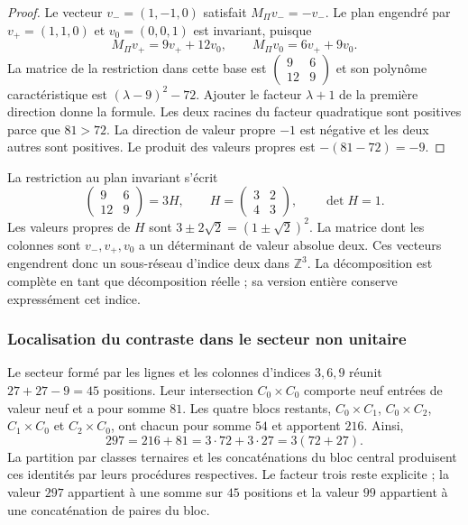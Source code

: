 \begin{proof}
Le vecteur $v_-=(1,-1,0)$ satisfait $M_\Pi v_-=-v_-$. Le plan engendré par $v_+=(1,1,0)$ et $v_0=(0,0,1)$ est invariant, puisque
\[
 M_\Pi v_+=9v_++12v_0,\qquad
 M_\Pi v_0=6v_++9v_0.
\]
La matrice de la restriction dans cette base est $\left(\begin{smallmatrix}9&6\\12&9\end{smallmatrix}\right)$ et son polynôme caractéristique est $(\lambda-9)^2-72$. Ajouter le facteur $\lambda+1$ de la première direction donne la formule. Les deux racines du facteur quadratique sont positives parce que $81>72$. La direction de valeur propre $-1$ est négative et les deux autres sont positives. Le produit des valeurs propres est $-(81-72)=-9$.
\end{proof}

La restriction au plan invariant s'écrit
\[
 \begin{pmatrix}9&6\\12&9\end{pmatrix}
 =3H,\qquad
 H=\begin{pmatrix}3&2\\4&3\end{pmatrix},\qquad\det H=1.
\]
Les valeurs propres de $H$ sont $3\pm2\sqrt2=(1\pm\sqrt2)^2$. La matrice dont les colonnes sont $v_-,v_+,v_0$ a un déterminant de valeur absolue deux. Ces vecteurs engendrent donc un sous-réseau d'indice deux dans $\mathbb Z^3$. La décomposition est complète en tant que décomposition réelle ; sa version entière conserve expressément cet indice.

\subsubsection{Localisation du contraste dans le secteur non unitaire}

Le secteur formé par les lignes et les colonnes d'indices $3,6,9$ réunit $27+27-9=45$ positions. Leur intersection $C_0\times C_0$ comporte neuf entrées de valeur neuf et a pour somme $81$. Les quatre blocs restants, $C_0\times C_1$, $C_0\times C_2$, $C_1\times C_0$ et $C_2\times C_0$, ont chacun pour somme $54$ et apportent $216$. Ainsi,
\[
 297=216+81=3\cdot72+3\cdot27=3(72+27).
\]
La partition par classes ternaires et les concaténations du bloc central produisent ces identités par leurs procédures respectives. Le facteur trois reste explicite ; la valeur $297$ appartient à une somme sur $45$ positions et la valeur $99$ appartient à une concaténation de paires du bloc.

